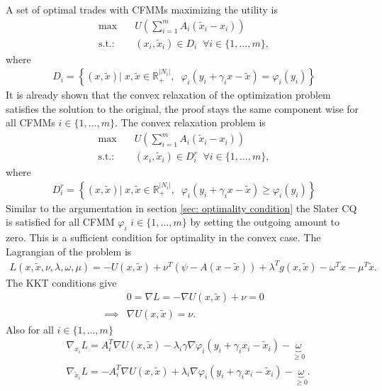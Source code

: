 A set of optimal trades with CFMMs maximizing the utility is
\begin{align}
    \text{max} \quad &U\left(\sum_{i=1}^{m} A_i(\tilde{x}_i-x_i)\right) \label{eq: multi_dex_trade_orig}\\
    \text{s.t.:}\quad
                      & (x_i, \tilde{x}_i) \in D_i \;\; \forall i \in
                      \{1,\ldots,m\},
\end{align}
where
\begin{align}
D_i = \left\{(x, \tilde{x})|\; x, \tilde{x} \in \mathbb{R}^{|N_i|}_+, \;\;
    \varphi_i(y_i+\gamma_ix - \tilde{x}) = \varphi_i(y_i)
\right\}
\end{align}
It is already shown that the convex relaxation of the optimization problem
satisfies the solution to the original, the proof stays the same
component wise for all CFMMs $i \in \{1,\ldots,m\}$. The convex relaxation
problem is
\begin{align}
    \text{max} \quad &U\left(\sum_{i=1}^{m} A_i(\tilde{x}_i-x_i)\right) \label{eq: multi_dex_trade}\\
    \text{s.t.:}\quad & (x_i, \tilde{x}_i) \in D_i^{r}
          \;\; \forall i \in
          \{1,\ldots,m\},
\end{align}
where
\begin{align}
D_i^{r}  = \left\{(x, \tilde{x})|\; x, \tilde{x} \in \mathbb{R}^{|N_i|}_+, \;\;
    \varphi_i(y_i+\gamma_ix - \tilde{x}) \ge \varphi_i(y_i)
\right\}
\end{align}
Similar to the argumentation in section \ref{sec: optimality condition} the
Slater CQ is satisfied for all CFMM $\varphi_i$ $i \in \{1,\ldots,m\}$ by
setting the outgoing amount to zero. This is a sufficient condition for
optimality in the convex case. The Lagrangian of the problem is
\begin{align}
    L(x, \tilde{x}, \nu, \lambda, \omega, \mu) = -U(x, \tilde{x}) +
    \nu^{T}\left(  \psi - A(x-\tilde{x})\right) + \lambda^{T} g(x, \tilde{x})
    -\omega^{T} x - \mu^{T} \tilde{x}.
\end{align}
The KKT conditions give
\begin{align}
    &0 = \nabla L = -\nabla U(x, \tilde{x}) + \nu = 0 \\
    \implies& \nabla U(x, \tilde{x}) = \nu.
\end{align}
Also for all $i \in \{1,\ldots,m\}$
\begin{align}
    &\nabla_{x_i} L = A_i^{T}\nabla U(x, \tilde{x}) - \lambda_i\gamma\nabla\varphi_i(y_i
    +\gamma_ix_i -\tilde{x}_i) - \underbrace{\omega}_{\ge0}\\
    &\nabla_{\tilde{x}_i} L = -A_i^{T}\nabla U(x, \tilde{x}) + \lambda_i\nabla\varphi_i(y_i
    +\gamma_ix_i -\tilde{x}_i) - \underbrace{\omega}_{\ge0}.
\end{align}
